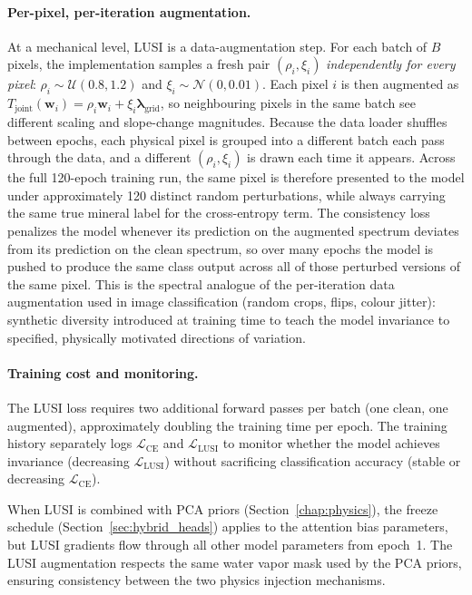 \documentclass[11pt]{report}
\begin{document}
\paragraph{Per-pixel, per-iteration augmentation.}
At a mechanical level, LUSI is a data-augmentation step. For each batch of $B$ pixels, the implementation samples a fresh pair $(\rho_i, \xi_i)$ \emph{independently for every pixel}: $\rho_i \sim \mathcal{U}(0.8, 1.2)$ and $\xi_i \sim \mathcal{N}(0, 0.01)$. Each pixel $i$ is then augmented as $T_{\text{joint}}(\mathbf{w}_i) = \rho_i \mathbf{w}_i + \xi_i \boldsymbol{\lambda}_{\text{grid}}$, so neighbouring pixels in the same batch see different scaling and slope-change magnitudes. Because the data loader shuffles between epochs, each physical pixel is grouped into a different batch each pass through the data, and a different $(\rho_i, \xi_i)$ is drawn each time it appears. Across the full 120-epoch training run, the same pixel is therefore presented to the model under approximately 120 distinct random perturbations, while always carrying the same true mineral label for the cross-entropy term. The consistency loss penalizes the model whenever its prediction on the augmented spectrum deviates from its prediction on the clean spectrum, so over many epochs the model is pushed to produce the same class output across all of those perturbed versions of the same pixel. This is the spectral analogue of the per-iteration data augmentation used in image classification (random crops, flips, colour jitter): synthetic diversity introduced at training time to teach the model invariance to specified, physically motivated directions of variation.

\paragraph{Training cost and monitoring.}
The LUSI loss requires two additional forward passes per batch (one clean, one augmented), approximately doubling the training time per epoch. The training history separately logs $\mathcal{L}_{\text{CE}}$ and $\mathcal{L}_{\text{LUSI}}$ to monitor whether the model achieves invariance (decreasing $\mathcal{L}_{\text{LUSI}}$) without sacrificing classification accuracy (stable or decreasing $\mathcal{L}_{\text{CE}}$).

When LUSI is combined with PCA priors (Section~\ref{chap:physics}), the freeze schedule (Section~\ref{sec:hybrid_heads}) applies to the attention bias parameters, but LUSI gradients flow through all other model parameters from epoch~1. The LUSI augmentation respects the same water vapor mask used by the PCA priors, ensuring consistency between the two physics injection mechanisms.
\end{document}
